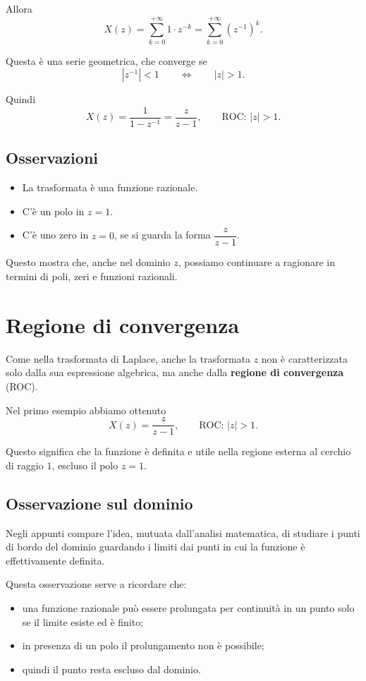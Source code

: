 Allora
\[
X(z)=\sum_{k=0}^{+\infty} 1\cdot z^{-k}
=
\sum_{k=0}^{+\infty}(z^{-1})^k.
\]

Questa è una serie geometrica, che converge se
\[
|z^{-1}|<1
\qquad\Longleftrightarrow\qquad
|z|>1.
\]

Quindi
\[
X(z)=\frac{1}{1-z^{-1}}
=
\frac{z}{z-1},
\qquad
\text{ROC: } |z|>1.
\]

\subsection{Osservazioni}

\begin{itemize}
    \item La trasformata è una funzione razionale.
    \item C'è un polo in \(z=1\).
    \item C'è uno zero in \(z=0\), se si guarda la forma \(\dfrac{z}{z-1}\).
\end{itemize}

Questo mostra che, anche nel dominio \(z\), possiamo continuare a ragionare in termini di poli,
zeri e funzioni razionali.

\section{Regione di convergenza}

Come nella trasformata di Laplace, anche la trasformata \(z\) non è caratterizzata solo
dalla sua espressione algebrica, ma anche dalla \textbf{regione di convergenza} (ROC).

Nel primo esempio abbiamo ottenuto
\[
X(z)=\frac{z}{z-1},
\qquad \text{ROC: } |z|>1.
\]

Questo significa che la funzione è definita e utile nella regione esterna al cerchio di raggio \(1\),
escluso il polo \(z=1\).

\subsection{Osservazione sul dominio}

Negli appunti compare l'idea, mutuata dall'analisi matematica, di studiare i punti di bordo
del dominio guardando i limiti dai punti in cui la funzione è effettivamente definita.

Questa osservazione serve a ricordare che:
\begin{itemize}
    \item una funzione razionale può essere prolungata per continuità in un punto
    solo se il limite esiste ed è finito;
    \item in presenza di un polo il prolungamento non è possibile;
    \item quindi il punto resta escluso dal dominio.
\end{itemize}

